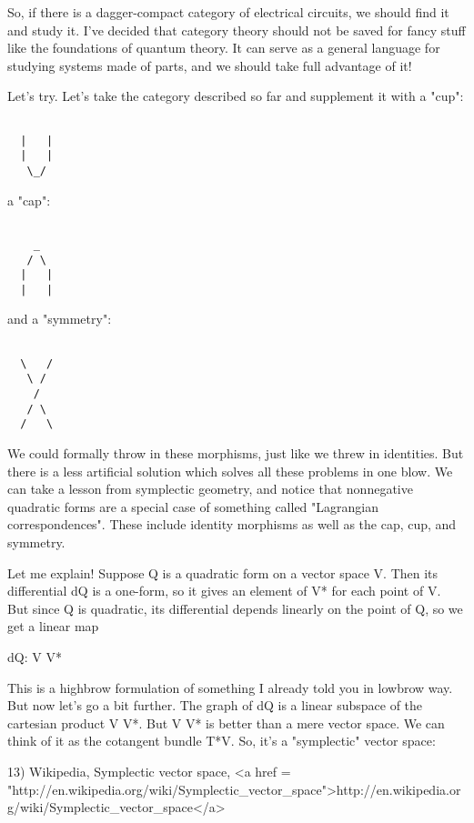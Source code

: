 So, if there is a dagger-compact category of electrical circuits, we
should find it and study it.  I've decided that category theory should
not be saved for fancy stuff like the foundations of quantum theory.  
It can serve as a general language for studying systems made of parts,
and we should take full advantage of it!

Let's try.  Let's take the category described so far and supplement it
with a "cup":


\begin{verbatim}

  |   |
  |   |
   \_/
\end{verbatim}
    
a "cap":

\begin{verbatim}

    _
   / \
  |   |
  |   |
\end{verbatim}
    
and a "symmetry":


\begin{verbatim}

  \   /
   \ /
    /
   / \
  /   \
\end{verbatim}
    
We could formally throw in these morphisms, just like we threw in
identities.  But there is a less artificial solution which solves all
these problems in one blow.  We can take a lesson from symplectic
geometry, and notice that nonnegative quadratic forms are a special
case of something called "Lagrangian correspondences".
These include identity morphisms as well as the cap, cup, and
symmetry.

Let me explain!  Suppose Q is a quadratic form on a vector space V.
Then its differential dQ is a one-form, so it gives an element of V*
for each point of V.  But since Q is quadratic, its differential
depends linearly on the point of Q, so we get a linear map

dQ: V \to  V*

This is a highbrow formulation of something I already told you in
lowbrow way.  But now let's go a bit further.  The graph of dQ is a
linear subspace of the cartesian product V \times  V*.  But V \times 
V* is better than a mere vector space.  We can think of it as the
cotangent bundle T*V.  So, it's a "symplectic" vector space:

13) Wikipedia, Symplectic vector space,
<a href = "http://en.wikipedia.org/wiki/Symplectic_vector_space">http://en.wikipedia.org/wiki/Symplectic_vector_space</a>

